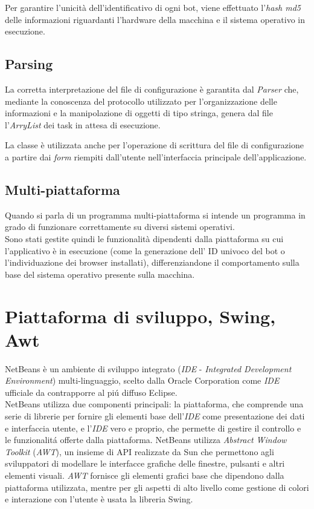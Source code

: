 Per garantire l'unicit\`{a} dell'identificativo di ogni bot, viene effettuato l'\textit{hash md5} delle informazioni riguardanti l'hardware della macchina e il sistema operativo in esecuzione.

\vspace*{0.5cm}
\subsection{Parsing}
La corretta interpretazione del file di configurazione \`{e} garantita dal \textit{Parser} che, mediante la conoscenza del protocollo utilizzato per l'organizzazione delle informazioni e la manipolazione di oggetti di tipo stringa, genera dal file l'\textit{ArryList} dei task in attesa di esecuzione. 

La classe \`{e} utilizzata anche per l'operazione di scrittura del file di configurazione a partire dai \textit{form} riempiti dall'utente nell'interfaccia principale dell'applicazione.

\vspace*{0.5cm}
\subsection{Multi-piattaforma}
Quando si parla di un programma multi-piattaforma si intende un programma in grado di funzionare correttamente su diversi sistemi operativi.\\
Sono stati gestite quindi le funzionalit\`{a} dipendenti dalla piattaforma su cui l'applicativo \`{e} in esecuzione (come la generazione dell' ID univoco del bot o l'individuazione dei browser installati), differenziandone il comportamento sulla base del sistema operativo presente sulla macchina.

\vspace*{0.5cm}
\section{Piattaforma di sviluppo, Swing, Awt}
NetBeans \`e un ambiente di sviluppo integrato (\textit{IDE} -  \textit{Integrated Development Environment}) multi-linguaggio, scelto dalla Oracle Corporation come \textit{IDE} ufficiale da contrapporre al pi\'u diffuso Eclipse.\\
NetBeans utilizza due componenti principali: la piattaforma, che comprende una serie di librerie per fornire gli elementi base dell'\textit{IDE} come presentazione dei dati e interfaccia utente, e l'\textit{IDE} vero e proprio, che permette di gestire il controllo e le funzionalit\'a offerte dalla piattaforma. NetBeans utilizza \textit{Abstract Window Toolkit} (\textit{AWT}), un insieme di API realizzate da Sun che permettono agli sviluppatori di modellare le interfacce grafiche delle finestre, pulsanti e altri elementi visuali. \textit{AWT} fornisce gli elementi grafici base che dipendono dalla piattaforma utilizzata, mentre per gli aspetti di alto livello come gestione di colori e interazione con l'utente \`e usata la libreria Swing.

